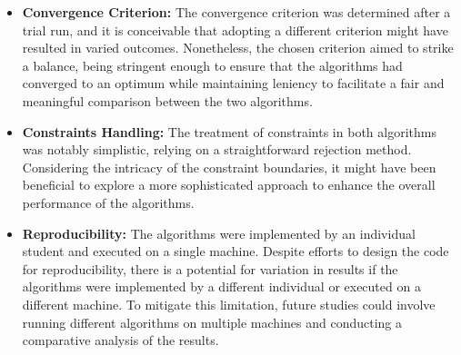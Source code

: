 \documentclass[10pt]{article}
\begin{document}
\begin{multicols}{2}
\begin{itemize}
    \item \textbf{Convergence Criterion:} The convergence criterion was determined after a trial run, and it is conceivable that adopting a different criterion might have resulted in varied outcomes. Nonetheless, the chosen criterion aimed to strike a balance, being stringent enough to ensure that the algorithms had converged to an optimum while maintaining leniency to facilitate a fair and meaningful comparison between the two algorithms.
    \item \textbf{Constraints Handling:} The treatment of constraints in both algorithms was notably simplistic, relying on a straightforward rejection method. Considering the intricacy of the constraint boundaries, it might have been beneficial to explore a more sophisticated approach to enhance the overall performance of the algorithms.
    \item \textbf{Reproducibility:} The algorithms were implemented by an individual student and executed on a single machine. Despite efforts to design the code for reproducibility, there is a potential for variation in results if the algorithms were implemented by a different individual or executed on a different machine. To mitigate this limitation, future studies could involve running different algorithms on multiple machines and conducting a comparative analysis of the results.
\end{itemize}
\end{multicols}
\end{document}
